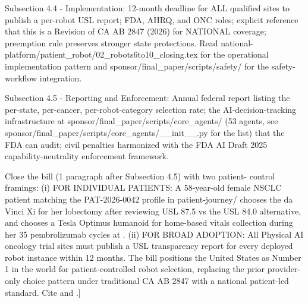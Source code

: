 Subsection 4.4 - Implementation: 12-month deadline for ALL qualified
sites to publish a per-robot USL report; FDA, AHRQ, and ONC roles;
explicit reference that this is a Revision of CA AB 2847 (2026) for
NATIONAL coverage; preemption rule preserves stronger state
protections. Read national-platform/patient\_robot/02\_robots6to10\_closing.tex
for the operational implementation pattern and
sponsor/final\_paper/scripts/safety/ for the safety-workflow integration.

Subsection 4.5 - Reporting and Enforcement: Annual federal report
listing the per-state, per-cancer, per-robot-category selection rate;
the AI-decision-tracking infrastructure at
sponsor/final\_paper/scripts/core\_agents/ (53 agents, see
sponsor/final\_paper/scripts/core\_agents/\_\_init\_\_.py for the list) that
the FDA can audit; civil penalties harmonized with the FDA AI Draft
2025 capability-neutrality enforcement framework.

Close the bill (1 paragraph after Subsection 4.5) with two patient-
control framings:
(i) FOR INDIVIDUAL PATIENTS: A 58-year-old female NSCLC patient
    matching the PAT-2026-0042 profile in patient-journey/ chooses the
    da Vinci Xi for her lobectomy after reviewing USL 87.5 vs the
    USL 84.0 alternative, and chooses a Tesla Optimus humanoid for
    home-based vitals collection during her 35 pembrolizumab cycles
    at \cite{dronca2026cancer_care_beyond_walls}.
(ii) FOR BROAD ADOPTION: All Physical AI oncology trial sites must
     publish a USL transparency report for every deployed robot
     instance within 12 months. The bill positions the United States
     as Number 1 in the world for patient-controlled robot selection,
     replacing the prior provider-only choice pattern under
     traditional CA AB 2847 with a national patient-led standard.
     Cite \cite{kawchak_2026_18810541} and \cite{kawchak_2026_19176370}.]
